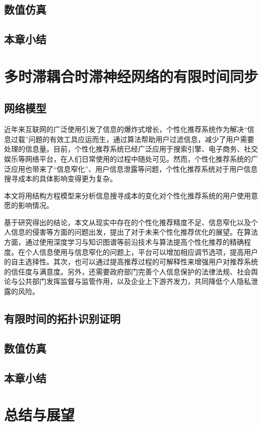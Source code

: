 \documentclass[a4paper,zihao=-4,UTF8]{ctexart}
\numberwithin{equation}{section}
\begin{document}
	\subsection{数值仿真}
	\subsection{本章小结}

\newpage
\section{多时滞耦合时滞神经网络的有限时间同步}
	\subsection{网络模型}
	近年来互联网的广泛使用引发了信息的爆炸式增长，个性化推荐系统作为解决“信息过载”问题的有效工具应运而生，通过算法帮助用户过滤信息，减少了用户需要处理的信息量。目前，个性化推荐系统已经广泛应用于搜索引擎、电子商务、社交娱乐等网络平台，在人们日常使用的过程中随处可见。然而，个性化推荐系统的广泛应用也带来了“信息窄化”、用户信息泄露等问题，个性化推荐系统对于用户信息搜寻成本的具体影响变得更为复杂。
	
	本文将用结构方程模型来分析信息搜寻成本的变化对个性化推荐系统的用户使用意愿的影响情况。
	
	基于研究得出的结论，本文从现实中存在的个性化推荐精度不足、信息窄化以及个人信息的侵害等方面的问题出发，提出了对于未来个性化推荐优化的展望。在算法方面，通过使用深度学习与知识图谱等前沿技术与算法提高个性化推荐的精确程度。在个人信息使用与信息窄化的问题上，平台可以增加相应调节选项，提高用户的自主选择性。其次，也可以通过提高推荐过程的可解释性来增强用户对推荐系统的信任度与满意度。另外，还需要政府部门完善个人信息保护的法律法规、社会舆论与公共部门发挥监督与监管作用，以及企业上下游齐发力，共同降低个人隐私泄露的风险。
	\subsection{有限时间的拓扑识别证明}
	\subsection{数值仿真}
	\subsection{本章小结}

\newpage
\section{总结与展望}
\end{document}
